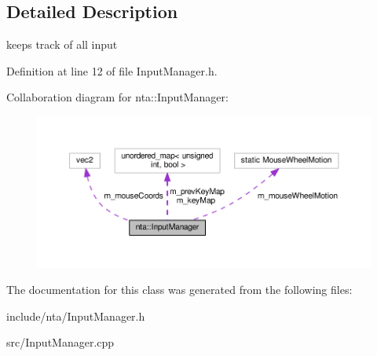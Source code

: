 \subsection{Detailed Description}
keeps track of all input 

Definition at line 12 of file Input\+Manager.\+h.



Collaboration diagram for nta\+:\+:Input\+Manager\+:\nopagebreak
\begin{figure}[H]
\begin{center}
\leavevmode
\includegraphics[width=350pt]{dc/d97/classnta_1_1InputManager__coll__graph}
\end{center}
\end{figure}


The documentation for this class was generated from the following files\+:\begin{DoxyCompactItemize}
\item 
include/nta/Input\+Manager.\+h\item 
src/Input\+Manager.\+cpp\end{DoxyCompactItemize}

